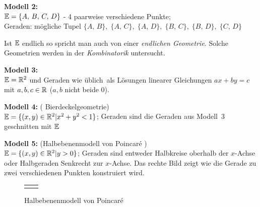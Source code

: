 {\bf Modell 2:}\\
$\mathbb E=\{A,\,B,\,C,\,D\}$ - 4 paarweise verschiedene Punkte;\\
Geraden: mögliche Tupel $\{A,\,B\},\;\{A,\,C\},\;\{A,\,D\},\;\{B,\,C\},\;\{B,\,D\},\;\{C,\,D\}$

Ist $\mathbb E$ endlich so spricht man auch von einer {\em endlichen Geometrie}.
Solche Geometrien werden in der {\em Kombinatorik} untersucht.


{\bf Modell 3:}\\$\mathbb E=\mathbb R^2$ und Geraden \glqq wie üblich\grqq\ als
Lösungen linearer Gleichungen $a x + b y = c$ mit $a,b,c\in \mathbb R$ ($a,b$
nicht beide $0$).

{\bf Modell 4:} ( \glqq Bierdeckelgeometrie\grqq )\\ %
$\mathbb E=\{ (x,y)\in\mathbb R^2 | x^2+y^2<1 \}$;
Geraden sind die Geraden aus Modell~3 geschnitten mit $\mathbb E$

\begin{center}
	
\end{center}


\bigskip


{\bf Modell 5:} (\glqq Halbebenenmodell von Poincaré \grqq )\\
$\mathbb E=\{ (x,y)\in\mathbb R^2 | y>0 \}$;
Geraden sind entweder Halbkreise oberhalb der $x$-Achse
oder Halbgeraden Senkrecht zur $x$-Achse. Das rechte Bild zeigt wie 
die Gerade zu zwei verschiedenen Punkten konstruiert wird. 


\begin{center}
	\begin{figure}[h]
		\begin{tabular}{cc}
			
			&
			
		\end{tabular}
		\caption{Halbebenenmodell von Poincaré}
	\end{figure}
\end{center}


\medskip


